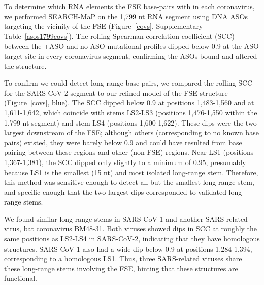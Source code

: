 \documentclass[main.tex]{subfiles}
\begin{document}
To determine which RNA elements the FSE base-pairs with in each coronavirus, we performed SEARCH-MaP on the 1,799 nt RNA segment using DNA ASOs targeting the vicinity of the FSE (Figure~\ref{covs}, Supplementary Table~\ref{asos1799covs}).
The rolling Spearman correlation coefficient (SCC) between the +ASO and no-ASO mutational profiles dipped below 0.9 at the ASO target site in every coronavirus segment, confirming the ASOs bound and altered the structure.

To confirm we could detect long-range base pairs, we compared the rolling SCC for the SARS-CoV-2 segment to our refined model of the FSE structure (Figure~\ref{covs}, blue).
The SCC dipped below 0.9 at positions 1,483-1,560 and at 1,611-1,642, which coincide with stems LS2-LS3 (positions 1,476-1,550 within the 1,799 nt segment) and stem LS4 (positions 1,600-1,622).
These dips were the two largest downstream of the FSE; although others (corresponding to no known base pairs) existed, they were barely below 0.9 and could have resulted from base pairing between these regions and other (non-FSE) regions.
Near LS1 (positions 1,367-1,381), the SCC dipped only slightly to a minimum of 0.95, presumably because LS1 is the smallest (15 nt) and most isolated long-range stem.
Therefore, this method was sensitive enough to detect all but the smallest long-range stem, and specific enough that the two largest dips corresponded to validated long-range stems.

We found similar long-range stems in SARS-CoV-1 and another SARS-related virus, bat coronavirus BM48-31.
Both viruses showed dips in SCC at roughly the same positions as LS2-LS4 in SARS-CoV-2, indicating that they have homologous structures.
SARS-CoV-1 also had a wide dip below 0.9 at positions 1,284-1,394, corresponding to a homologous LS1.
Thus, three SARS-related viruses share these long-range stems involving the FSE, hinting that these structures are functional.
\end{document}
